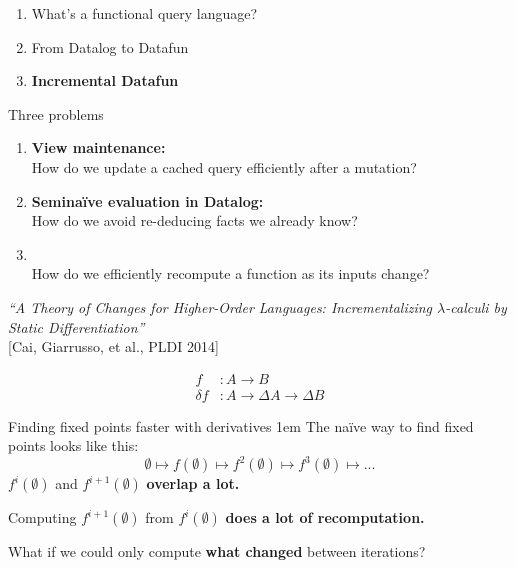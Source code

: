 \documentclass[xcolor=table,usenames,dvipsnames,svgnames]{beamer}
\begin{document}

\begin{frame}\Large
  \begin{enumerate}\color{gray}\itemsep 1.5em
  \item What's a functional query language?
  \item From Datalog to Datafun
  \item {\color{black}\bf Incremental Datafun}
  \end{enumerate}
\end{frame}


\begin{frame}{Three problems}\large
  \begin{enumerate}\itemsep 1em
  \item {\bf View maintenance:} \\
    {\normalsize How do we update a cached query efficiently after a mutation?}\
    \pause
  \item {\bf Semina\"ive evaluation in Datalog:}\\
    {\normalsize How do we avoid re-deducing facts we already know?}
    \pause
  \item \color{black}{\bf Incremental computation:}\\
    {\normalsize How do we efficiently recompute a function as its
      inputs change?}
  \end{enumerate}
\end{frame}

\begin{frame}
  \Large {\itshape ``A Theory of Changes for Higher-Order Languages:
    Incrementalizing $\lambda$-calculi by Static Differentiation''}%
  \\[.2em]
  \normalsize [Cai, Giarrusso, et al., PLDI 2014]

  \vspace{1em}\pause\LARGE
  \begin{align*}
    f &: A \to B\\
    \delta f &: A \to \Delta A \to \Delta B
  \end{align*}


\end{frame}


\begin{frame}{Finding fixed points faster with derivatives}
  \large \parskip 1em\vspace{-1em}
  The na\"ive way to find fixed points looks like this:
  $${\emptyset \mapsto f(\emptyset) \mapsto f^2(\emptyset) \mapsto f^3(\emptyset) \mapsto ...}$$
  \pause
  $f^i(\emptyset)$ and $f^{i+1}(\emptyset)$ \textbf{overlap a lot.}

  Computing $f^{i+1}(\emptyset)$ from $f^i(\emptyset)$ \textbf{does a lot of recomputation.}

  \pause
  What if we could only compute \textbf{what changed} between iterations?
\end{frame}
\end{document}
